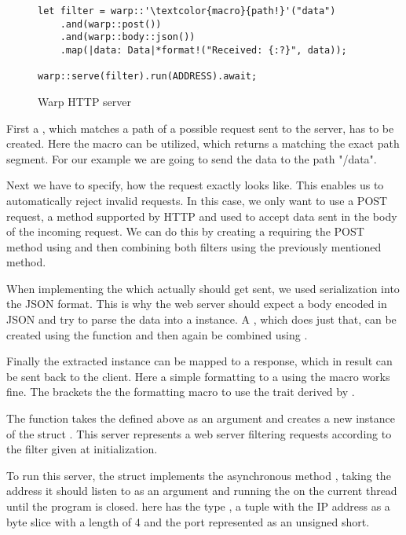 \begin{figure}[ht]
    \begin{verbatim}
let filter = warp::'\textcolor{macro}{path!}'("data")
    .and(warp::post())
    .and(warp::body::json())
    .map(|data: Data|*format!("Received: {:?}", data));

warp::serve(filter).run(ADDRESS).await;
    \end{verbatim}
    \caption{Warp HTTP server}
    \label{http-server}
\end{figure}

First a , which matches a path of a possible request sent to the server, has to be created. Here the macro
 can be utilized, which returns a  matching the exact path segment. For our
example we are going to send the data to the path "/data".

Next we have to specify, how the request exactly looks like. This enables us to automatically reject invalid requests.
In this case, we only want to use a POST request, a method supported by HTTP and used to accept data sent in the body
of the incoming request. We can do this by creating a  requiring the POST method using 
and then combining both filters using the previously mentioned  method.

When implementing the  which actually should get sent, we used serialization into the JSON format. This is
why the web server should expect a body encoded in JSON and try to parse the data into a  instance. A
, which does just that, can be created using the function  and then again be
combined using .

Finally the extracted  instance can be mapped to a response, which in result can be sent back to the client.
Here a simple formatting to a  using the  macro works fine. The  brackets
the the formatting macro to use the  trait derived by .

The function  takes the  defined above as an argument and creates a new instance of the
struct . This server represents a web server filtering requests according to the filter given at
initialization.

To run this server, the struct implements the asynchronous method , taking the address it should listen to
as an argument and running the  on the current thread until the program is closed.  here has
the type , a tuple with the IP address as a byte slice with a length of 4 and the port represented
as an unsigned short.

